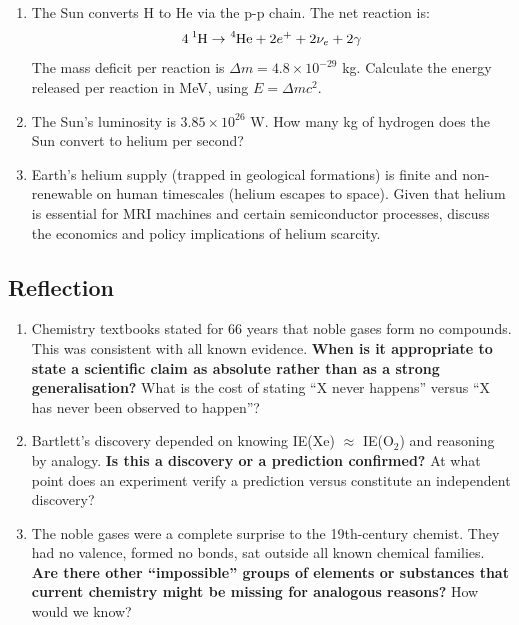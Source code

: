 \documentclass[12pt, a4paper]{book}
\begin{document}
\begin{deepbox}
\begin{enumerate}[label=\textbf{D\arabic*.}]
        \begin{enumerate}[label=(\alph*)]
          \item The Sun converts H to He via the p-p chain.
                The net reaction is:
                \[
                  4\,\ce{^1H} \to \ce{^4He} + 2e^+ + 2\nu_e + 2\gamma
                \]
                The mass deficit per reaction is $\Delta m = 4.8\times10^{-29}$ kg.
                Calculate the energy released per reaction
                in MeV, using $E = \Delta mc^2$.
          \item The Sun's luminosity is $3.85\times10^{26}$ W.
                How many kg of hydrogen does the Sun
                convert to helium per second?
          \item Earth's helium supply (trapped in geological
                formations) is finite and non-renewable
                on human timescales (helium escapes to space).
                Given that helium is essential for MRI machines
                and certain semiconductor processes,
                discuss the economics and policy implications
                of helium scarcity.
        \end{enumerate}

\end{enumerate}
\end{deepbox}

\subsection*{Reflection}

\begin{reflectionbox}
\begin{enumerate}[label=\textbf{R\arabic*.}]
  \item Chemistry textbooks stated for 66 years that noble
        gases form no compounds.
        This was consistent with all known evidence.
        \textbf{When is it appropriate to state a scientific
        claim as absolute rather than as a strong generalisation?}
        What is the cost of stating ``X never happens''
        versus ``X has never been observed to happen''?

  \item Bartlett's discovery depended on knowing IE(Xe) $\approx$ IE(O$_2$)
        and reasoning by analogy.
        \textbf{Is this a discovery or a prediction confirmed?}
        At what point does an experiment verify a prediction
        versus constitute an independent discovery?

  \item The noble gases were a complete surprise to the
        19th-century chemist.
        They had no valence, formed no bonds, sat outside
        all known chemical families.
        \textbf{Are there other ``impossible'' groups of elements
        or substances that current chemistry might be
        missing for analogous reasons?}
        How would we know?
\end{enumerate}
\end{reflectionbox}
\end{document}
